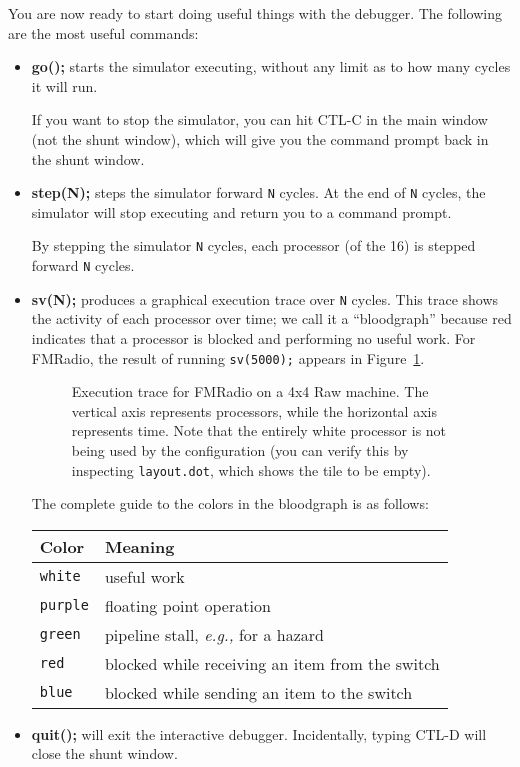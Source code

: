 You are now ready to start doing useful things with the debugger.  The
following are the most useful commands:

\begin{itemize}

\item {\bf go();} starts the simulator executing, without any limit as
to how many cycles it will run.

If you want to stop the simulator, you can hit CTL-C in the main
window (not the shunt window), which will give you the command prompt
back in the shunt window.

\item {\bf step(N);} steps the simulator forward \texttt{N} cycles. At
the end of {\tt N} cycles, the simulator will stop executing and
return you to a command prompt.

By stepping the simulator \texttt{N} cycles, each processor (of the
16) is stepped forward \texttt{N} cycles.

\item {\bf sv(N);} produces a graphical execution trace over {\tt N}
cycles.  This trace shows the activity of each processor over time; we
call it a ``bloodgraph'' because red indicates that a processor is
blocked and performing no useful work.  For FMRadio, the result of
running {\tt sv(5000);} appears in Figure~\ref{fig:fm-bloodgraph}.

\clearpage

\begin{figure}[t]
\begin{center}
\hspace{0pt}
\caption{\protect\small Execution trace for FMRadio on a 4x4 Raw
machine.  The vertical axis represents processors, while the
horizontal axis represents time.  Note that the entirely white
processor is not being used by the configuration (you can verify this
by inspecting {\tt layout.dot}, which shows the tile to be
empty).\protect\label{fig:fm-bloodgraph}}
\end{center}
\end{figure}

The complete guide to the colors in the bloodgraph is as follows: \vspace{6pt}

\begin{tabular}{|l|l|}
\hline
{\bf Color} & {\bf Meaning} \\
\hline
{\tt white} & useful work\\ \hline
{\tt purple} & floating point operation\\ \hline
{\tt green} & pipeline stall, {\it e.g.,} for a hazard\\ \hline
{\tt red} & blocked while receiving an item from the switch\\ \hline
{\tt blue} & blocked while sending an item to the switch\\ \hline
\end{tabular}

\item {\bf quit();} will exit the interactive debugger.  Incidentally,
typing CTL-D will close the shunt window.

\end{itemize}
